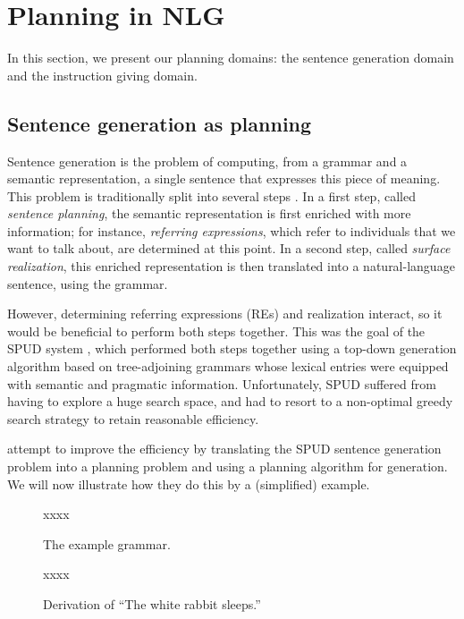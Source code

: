 \section{Planning in NLG} \label{sec:domains}

In this section, we present our planning domains: the sentence
generation domain and the instruction giving domain.


\subsection{Sentence generation as planning}

Sentence generation is the problem of computing, from a grammar and a
semantic representation, a single sentence that expresses this piece
of meaning.  This problem is traditionally split into several steps
\cite{reiter00building}.  In a first step, called \emph{sentence
  planning}, the semantic representation is first enriched with more
information; for instance, \emph{referring expressions}, which refer
to individuals that we want to talk about, are determined at this
point.  In a second step, called \emph{surface realization}, this
enriched representation is then translated into a natural-language
sentence, using the grammar.

However, determining referring expressions (REs) and realization
interact, so it would be beneficial to perform both steps together.
This was the goal of the SPUD system \cite{Stone2003a}, which
performed both steps together using a top-down generation algorithm
based on tree-adjoining grammars \cite{joshi;etal1997} whose lexical
entries were equipped with semantic and pragmatic information.
Unfortunately, SPUD suffered from having to explore a huge search
space, and had to resort to a non-optimal greedy search strategy to
retain reasonable efficiency.

\cite{KolSto07} attempt to improve the efficiency by translating the
SPUD sentence generation problem into a planning problem and using a
planning algorithm for generation.  We will now illustrate how they do
this by a (simplified) example.

\begin{figure}
  \centering
  xxxx
  \caption{The example grammar.}
  \label{fig:white-rabbit-sleeps-grammar}
\end{figure}

\begin{figure}
  \centering
  xxxx
  \caption{Derivation of ``The white rabbit sleeps.''}
  \label{fig:white-rabbit-sleeps-deriv}
\end{figure}

